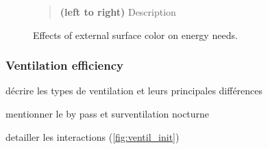 \documentclass[11pt]{article}
\begin{document}
\begin{figure}[ht]
                \caption{\label{fig:color_init} Effects of external surface color on energy needs.}
                \begin{quote}
                    \vspace{-2mm}
                    \small\noindent
                    \textbf{(left to right)} Description
                  \end{quote}
            \end{figure}
        

        \subsubsection{Ventilation efficiency} %
        \label{ssub:ventilation_efficiency}

            décrire les types de ventilation et leurs principales différences 

            mentionner le by pass et surventilation nocturne 

            detailler les interactions (\ref{fig:ventil_init})
\end{document}
